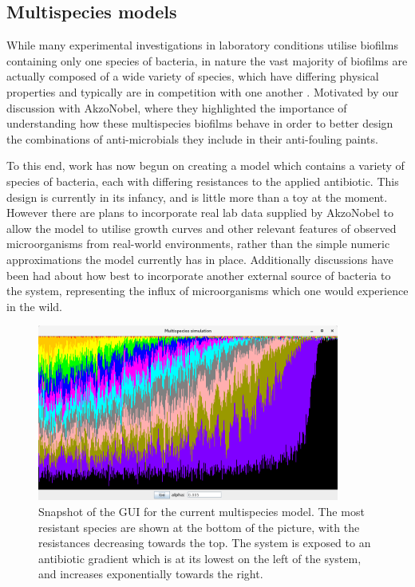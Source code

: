 \documentclass[a4paper,12pt]{article}
\begin{document}
\subsection{Multispecies models}

While many experimental investigations in laboratory conditions utilise biofilms containing only one species of bacteria, in nature the vast majority of biofilms are actually composed 
of a wide variety of species, which have differing physical properties and typically are in competition with one another \cite{bioref:Elias-biofilm-multispecies-2012}.  Motivated by 
our discussion with AkzoNobel, where they highlighted the importance of understanding how these multispecies biofilms behave in order to better design the combinations of 
anti-microbials they include in their anti-fouling paints.

To this end, work has now begun on creating a model which contains a variety of species of bacteria, each with differing resistances to the applied antibiotic.  This design is 
currently in its infancy, and is little more than a toy at the moment.  However there are plans to incorporate real lab data supplied by AkzoNobel to allow the model to utilise 
growth curves and other relevant features of observed microorganisms from real-world environments, rather than the simple numeric approximations the model currently has in place.  
Additionally discussions have been had about how best to incorporate another external source of bacteria to the system, representing the influx of microorganisms which one would 
experience in the wild.

\begin{figure}[H]
 \centering
 \includegraphics[height=5.8cm]{multispecies-snapshot}
 \caption{Snapshot of the GUI for the current multispecies model.  The most resistant species are shown at the bottom of the picture, with the resistances decreasing towards the top.  
 The system is exposed to an antibiotic gradient which is at its lowest on the left of the system, and increases exponentially towards the right.}
 \label{fig:multispecies-snapshot}
\end{figure}
\end{document}
